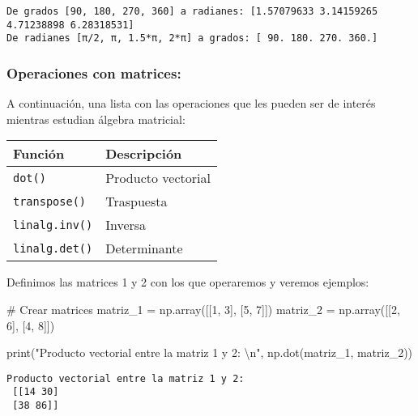 \documentclass[
  letterpaper,
  DIV=11,
  numbers=noendperiod]{scrreprt}
\newenvironment{Shaded}{\begin{snugshade}}{\end{snugshade}}
\newcommand{\BuiltInTok}[1]{\textcolor[rgb]{0.00,0.23,0.31}{#1}}
\newcommand{\CharTok}[1]{\textcolor[rgb]{0.13,0.47,0.30}{#1}}
\newcommand{\CommentTok}[1]{\textcolor[rgb]{0.37,0.37,0.37}{#1}}
\newcommand{\DecValTok}[1]{\textcolor[rgb]{0.68,0.00,0.00}{#1}}
\newcommand{\NormalTok}[1]{\textcolor[rgb]{0.00,0.23,0.31}{#1}}
\newcommand{\OperatorTok}[1]{\textcolor[rgb]{0.37,0.37,0.37}{#1}}
\newcommand{\StringTok}[1]{\textcolor[rgb]{0.13,0.47,0.30}{#1}}
\begin{document}
\begin{verbatim}
De grados [90, 180, 270, 360] a radianes: [1.57079633 3.14159265 4.71238898 6.28318531]
De radianes [π/2, π, 1.5*π, 2*π] a grados: [ 90. 180. 270. 360.]
\end{verbatim}

\subsubsection{Operaciones con
matrices:}\label{operaciones-con-matrices}

A continuación, una lista con las operaciones que les pueden ser de
interés mientras estudian álgebra matricial:

\begin{longtable}[]{@{}ll@{}}
\toprule\noalign{}
Función & Descripción \\
\midrule\noalign{}
\endhead
\bottomrule\noalign{}
\endlastfoot
\texttt{dot()} & Producto vectorial \\
\texttt{transpose()} & Traspuesta \\
\texttt{linalg.inv()} & Inversa \\
\texttt{linalg.det()} & Determinante \\
\end{longtable}

Definimos las matrices 1 y 2 con los que operaremos y veremos ejemplos:

\begin{Shaded}
\begin{Highlighting}[]
\CommentTok{\# Crear matrices}
\NormalTok{matriz\_1 }\OperatorTok{=}\NormalTok{ np.array([[}\DecValTok{1}\NormalTok{, }\DecValTok{3}\NormalTok{], [}\DecValTok{5}\NormalTok{, }\DecValTok{7}\NormalTok{]])}
\NormalTok{matriz\_2 }\OperatorTok{=}\NormalTok{ np.array([[}\DecValTok{2}\NormalTok{, }\DecValTok{6}\NormalTok{], [}\DecValTok{4}\NormalTok{, }\DecValTok{8}\NormalTok{]])}
\end{Highlighting}
\end{Shaded}

\begin{Shaded}
\begin{Highlighting}[]
\BuiltInTok{print}\NormalTok{(}\StringTok{"Producto vectorial entre la matriz 1 y 2: }\CharTok{\textbackslash{}n}\StringTok{"}\NormalTok{, np.dot(matriz\_1, matriz\_2))}
\end{Highlighting}
\end{Shaded}

\begin{verbatim}
Producto vectorial entre la matriz 1 y 2: 
 [[14 30]
 [38 86]]
\end{verbatim}
\end{document}
